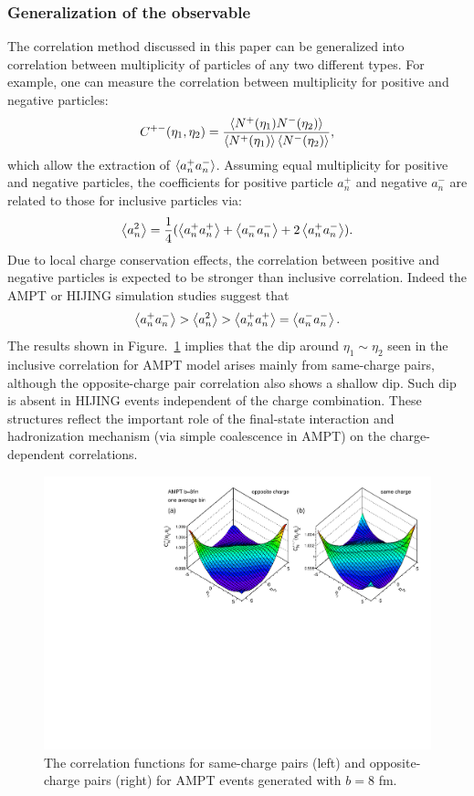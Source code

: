 \subsubsection{Generalization of the observable}

The correlation method discussed in this paper can be generalized into correlation between multiplicity of particles of any two different types. For example, one can measure the correlation between multiplicity for positive and negative particles:
\begin{equation}
C^{+-}(\eta_1, \eta_2) = \frac{\left\langle N^+(\eta_1)N^-(\eta_2)\right\rangle}{\left\langle N^+(\eta_1)\right\rangle\left\langle N^-(\eta_2)\right\rangle},
\end{equation}
which allow the extraction of $\left\langle a_n^+ a_n^-\right\rangle$. Assuming equal multiplicity for positive and negative particles, the coefficients for positive particle $a^+_n$ and negative $a^-_n$ are related to those for inclusive particles via:
\begin{equation}
\left\langle a_n^2\right\rangle = \frac{1}{4}(\left\langle a_n^+ a_n^+\right\rangle + \left\langle a_n^- a_n^-\right\rangle + 2\left\langle a_n^+ a_n^-\right\rangle).
\end{equation}
Due to local charge conservation effects, the correlation between positive and negative particles is expected to be stronger than inclusive correlation. Indeed the AMPT or HIJING simulation studies suggest that
\begin{equation}
\left\langle a_n^+ a_n^-\right\rangle > \left\langle a_n^2\right\rangle > \left\langle a_n^+ a_n^+\right\rangle = \left\langle a_n^- a_n^-\right\rangle.
\end{equation}
The results shown in Figure.~\ref{fig:fbcorr_Model_corr_chargeComp} implies that the dip around $\eta_1 \sim \eta_2$ seen in the inclusive correlation for AMPT model arises mainly from same-charge pairs, although the opposite-charge pair correlation also shows a shallow dip. Such dip is absent in HIJING events independent of the charge combination. These structures reflect the important role of the final-state interaction and hadronization mechanism (via simple coalescence in AMPT) on the charge-dependent correlations.

\begin{figure}[H]
\centering
\includegraphics[width=.95\linewidth]{figs/chapter_fbcorr/Model_corr_chargeComp.pdf}
\caption{The correlation functions for same-charge pairs (left) and opposite-charge pairs (right) for AMPT events generated with $b=8$ fm.}
\label{fig:fbcorr_Model_corr_chargeComp}
\end{figure}

